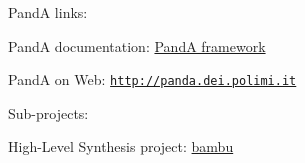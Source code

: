 PandA links\+:
\begin{DoxyItemize}
\item PandA documentation\+: \hyperlink{PandA_DOC}{PandA framework}
\item PandA on Web\+: \href{http://panda.dei.polimi.it}{\tt http\+://panda.\+dei.\+polimi.\+it}
\end{DoxyItemize}

Sub-\/projects\+:
\begin{DoxyItemize}
\item High-\/\+Level Synthesis project\+: \hyperlink{src_bambu}{bambu} 
\end{DoxyItemize}